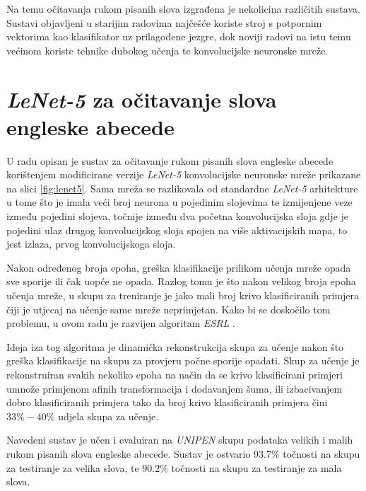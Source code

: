 Na temu očitavanja rukom pisanih slova izgrađena je nekolicina različitih sustava. Sustavi objavljeni u starijim radovima najčešće koriste stroj s potpornim vektorima  kao klasifikator uz prilagođene jezgre, dok noviji radovi na istu temu većinom koriste tehnike dubokog učenja te konvolucijske neuronske mreže.

\section{\emph{LeNet-5} za očitavanje slova engleske abecede}

U radu \citep{lenet5hecr} opisan je sustav za očitavanje rukom pisanih slova engleske abecede korištenjem modificirane verzije \emph{LeNet-5} konvolucijske neuronske mreže prikazane na slici \ref{fig:lenet5}. Sama mreža se razlikovala od standardne \emph{LeNet-5} arhitekture u tome što je imala veći broj neurona u pojedinim slojevima te izmijenjene veze između pojedini slojeva, točnije između dva početna konvolucijska sloja gdje je pojedini ulaz drugog konvolucijskog sloja spojen na više aktivacijskih mapa, to jest izlaza, prvog konvolucijskoga sloja.
 
Nakon određenog broja epoha, greška klasifikacije prilikom učenja mreže opada sve sporije ili čak uopće ne opada. Razlog tomu je što nakon velikog broja epoha učenja mreže, u skupu za treniranje je jako mali broj krivo klasificiranih primjera čiji je utjecaj na učenje same mreže neprimjetan. Kako bi se doskočilo tom problemu, u ovom radu je razvijen algoritam \emph{ESRL} .

Ideja iza tog algoritma je dinamička rekonstrukcija skupa za učenje nakon što greška klasifikacije na skupu za provjeru počne sporije opadati. Skup za učenje je rekonstruiran svakih nekoliko epoha na način da se krivo klasificirani primjeri umnože primjenom afinih transformacija i dodavanjem šuma, ili izbacivanjem dobro klasificiranih primjera tako da broj krivo klasificiranih primjera čini $33\% - 40\%$ udjela skupa za učenje.
 
 Navedeni sustav je učen i evaluiran na \emph{UNIPEN} skupu podataka velikih i malih rukom pisanih slova engleske abecede. Sustav je ostvario $93.7\%$ točnosti na skupu za testiranje za velika slova, te $90.2\%$ točnosti na skupu za testiranje za mala slova.
 

 
